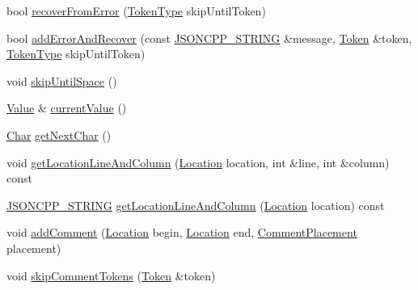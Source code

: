 \begin{DoxyCompactItemize}
\item 
bool \hyperlink{class_json_1_1_our_reader_a035651f0700a76a815e5f904c63ebb1c}{recover\+From\+Error} (\hyperlink{class_json_1_1_our_reader_a15116f7276ddf1e7a2cc3cbefa884dcc}{Token\+Type} skip\+Until\+Token)
\item 
bool \hyperlink{class_json_1_1_our_reader_a074cf3d91e9404fe89e03cfc6a43e6fb}{add\+Error\+And\+Recover} (const \hyperlink{json_8h_a1e723f95759de062585bc4a8fd3fa4be}{J\+S\+O\+N\+C\+P\+P\+\_\+\+S\+T\+R\+I\+NG} \&message, \hyperlink{class_json_1_1_our_reader_1_1_token}{Token} \&token, \hyperlink{class_json_1_1_our_reader_a15116f7276ddf1e7a2cc3cbefa884dcc}{Token\+Type} skip\+Until\+Token)
\item 
void \hyperlink{class_json_1_1_our_reader_ad48bdaf5b686706f003e792fdbcbf102}{skip\+Until\+Space} ()
\item 
\hyperlink{class_json_1_1_value}{Value} \& \hyperlink{class_json_1_1_our_reader_a2acd5b1d53e7d7e17c21ff8e96edc09d}{current\+Value} ()
\item 
\hyperlink{class_json_1_1_our_reader_a0cd0bab4caa66594ab843ccd5f9dc239}{Char} \hyperlink{class_json_1_1_our_reader_a298285d035fdbc554caae09d9f0a5859}{get\+Next\+Char} ()
\item 
void \hyperlink{class_json_1_1_our_reader_af482c8e718615646e13a996292e18d74}{get\+Location\+Line\+And\+Column} (\hyperlink{class_json_1_1_our_reader_a1bdc7bbc52ba87cae6b19746f2ee0189}{Location} location, int \&line, int \&column) const
\item 
\hyperlink{json_8h_a1e723f95759de062585bc4a8fd3fa4be}{J\+S\+O\+N\+C\+P\+P\+\_\+\+S\+T\+R\+I\+NG} \hyperlink{class_json_1_1_our_reader_ac129e94cdc260822b2fd24e2ca35e636}{get\+Location\+Line\+And\+Column} (\hyperlink{class_json_1_1_our_reader_a1bdc7bbc52ba87cae6b19746f2ee0189}{Location} location) const
\item 
void \hyperlink{class_json_1_1_our_reader_ad7318c37469a9106069a236fb4b10e1f}{add\+Comment} (\hyperlink{class_json_1_1_our_reader_a1bdc7bbc52ba87cae6b19746f2ee0189}{Location} begin, \hyperlink{class_json_1_1_our_reader_a1bdc7bbc52ba87cae6b19746f2ee0189}{Location} end, \hyperlink{namespace_json_a4fc417c23905b2ae9e2c47d197a45351}{Comment\+Placement} placement)
\item 
void \hyperlink{class_json_1_1_our_reader_a856dea44d92578c276856d7a65a4ebdc}{skip\+Comment\+Tokens} (\hyperlink{class_json_1_1_our_reader_1_1_token}{Token} \&token)
\end{DoxyCompactItemize}
